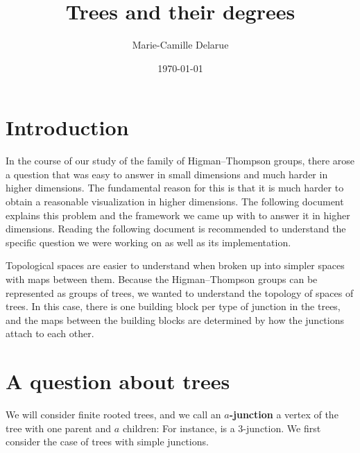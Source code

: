 \documentclass[12pt]{amsart}
\title{Trees and their degrees}
\author{Marie-Camille Delarue}
\date{\today}
\newcommand\Cseries[1]{\Forest{Cseries #1}}
\theoremstyle{plain}
\theoremstyle{definition}
\theoremstyle{remark}
\begin{document}
\maketitle
\tableofcontents

\section{Introduction}

In the course of our study of the family of Higman--Thompson groups, 
there arose a question that was easy to answer in small dimensions
and much harder in higher dimensions.
The fundamental reason for this is that it is much harder to obtain a reasonable visualization in higher dimensions.
The following document explains this problem and the framework we came up with to answer it in higher dimensions.
Reading the following document is recommended to understand the specific question we were working on as well as its implementation.

Topological spaces are easier to understand when broken up into simpler spaces with maps between them.
Because the Higman--Thompson groups can be represented as groups of trees, we wanted to understand the topology of spaces of trees.
In this case, there is one building block per type of junction in the trees, 
and the maps between the building blocks are determined by how the junctions attach to each other.

\section{A question about trees}\label{treeprob}

We will consider finite rooted trees, and we call an \textbf{$a$-junction} a vertex of the tree with one parent and $a$ children: 
For instance, \Cseries{[[[][][]]]} is a 3-junction.
We first consider the case of trees with simple junctions.
\end{document}
